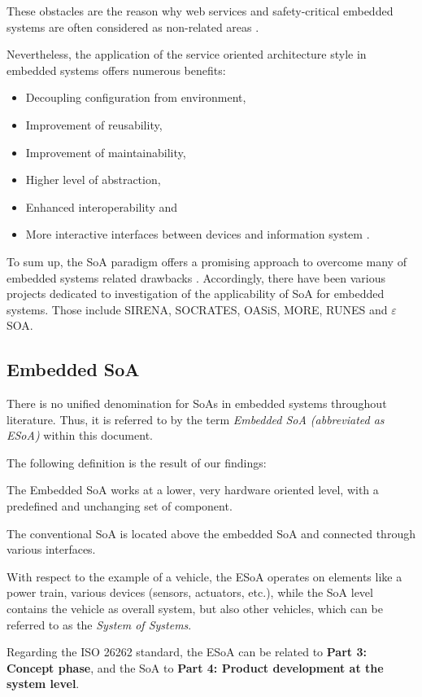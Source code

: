 These obstacles are the reason why web services and safety-critical embedded systems are often considered as non-related areas \cite{rodrigues2011}.

Nevertheless, the application of the service oriented architecture style in embedded systems offers numerous benefits: 
\begin{itemize}
\item Decoupling configuration from environment, 
\item Improvement of reusability,
\item Improvement of maintainability,
\item Higher level of abstraction,
\item Enhanced interoperability and
\item More interactive interfaces between devices and information system \cite{buckl}.
\end{itemize}

To sum up, the SoA paradigm offers a promising approach to overcome many of embedded systems related drawbacks \cite{buckl} \cite{sommer}. Accordingly, there have been various projects dedicated to investigation of the applicability of SoA for embedded systems. Those include SIRENA, SOCRATES, OASiS, MORE, RUNES and $\varepsilon$SOA. 



\subsection{Embedded SoA}
There is no unified denomination for SoAs in embedded systems throughout literature. Thus, it is referred to by the term \emph{Embedded SoA (abbreviated as ESoA)} within this document.

The following definition is the result of our findings:
\begin{myquote}
The Embedded SoA works at a lower, very hardware oriented level, with a predefined and unchanging set of component.

The conventional SoA is located above the embedded SoA and connected through various interfaces.
\end{myquote}

With respect to the example of a vehicle, the ESoA operates on elements like a power train, various devices (sensors, actuators, etc.), while the SoA level contains the vehicle as overall system, but also other vehicles, which can be referred to as the \emph{System of Systems}.

Regarding the ISO 26262 standard, the ESoA can be related to \textbf{Part 3: Concept phase}, and the SoA to \textbf{Part 4: Product development at the system level}.


